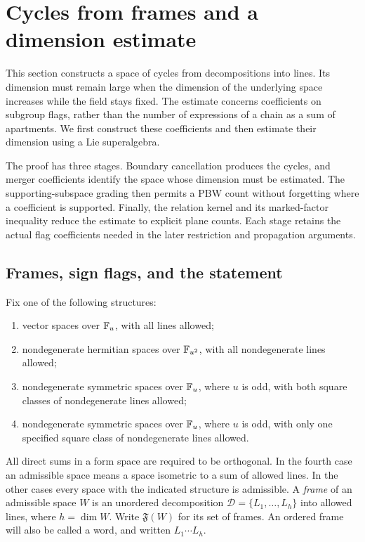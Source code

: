 \section{Cycles from frames and a dimension estimate}\label{sec:frames}

This section constructs a space of cycles from decompositions into lines.
Its dimension must remain large when the dimension of the underlying space
increases while the field stays fixed.  The estimate concerns coefficients
on subgroup flags, rather than the number of expressions of a chain as a
sum of apartments.  We first construct these coefficients and then estimate
their dimension using a Lie superalgebra.

The proof has three stages. Boundary cancellation produces the cycles,
and merger coefficients identify the space whose dimension must be
estimated. The supporting-subspace grading then permits a PBW count
without forgetting where a coefficient is supported. Finally, the
relation kernel and its marked-factor inequality reduce the estimate
to explicit plane counts. Each stage retains the actual flag
coefficients needed in the later restriction and propagation arguments.

\subsection{Frames, sign flags, and the statement}

Fix one of the following structures:
\begin{enumerate}
\item vector spaces over $\mathbb F_u$, with all lines allowed;
\item nondegenerate hermitian spaces over $\mathbb F_{u^2}$, with all
nondegenerate lines allowed;
\item nondegenerate symmetric spaces over $\mathbb F_u$, where $u$ is odd,
with both square classes of nondegenerate lines allowed;
\item nondegenerate symmetric spaces over $\mathbb F_u$, where $u$ is odd,
with only one specified square class of nondegenerate lines allowed.
\end{enumerate}
All direct sums in a form space are required to be orthogonal.  In the
fourth case an admissible space means a space isometric to a sum of allowed
lines.  In the other cases every space with the indicated structure is
admissible.  A \emph{frame} of an admissible space $W$ is an unordered
decomposition $\mathcal D=\{L_1,\ldots,L_h\}$ into allowed lines, where
$h=\dim W$.  Write $\mathfrak F(W)$ for its set of frames.  An ordered
frame will also be called a word, and written $L_1\cdots L_h$.


